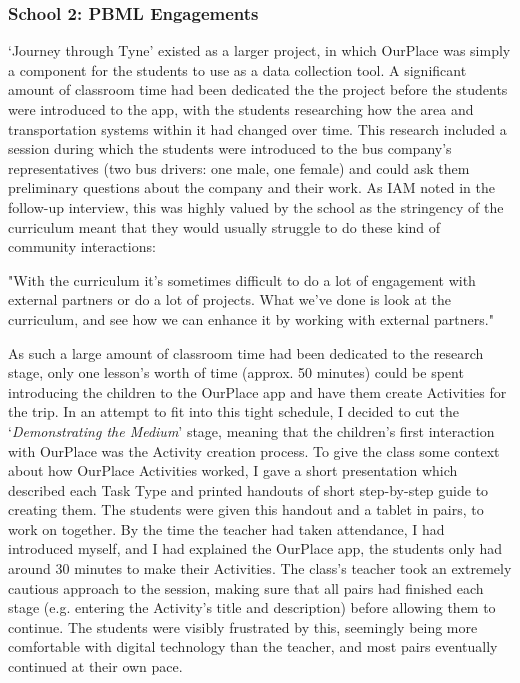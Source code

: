 \subsubsection{School 2: PBML Engagements}
`Journey through Tyne' existed as a larger project, in which OurPlace was simply a component for the students to use as a data collection tool. A significant amount of classroom time had been dedicated the the project before the students were introduced to the app, with the students researching how the area and transportation systems within it had changed over time. This research included a session during which the students were introduced to the bus company's representatives (two bus drivers: one male, one female) and could ask them preliminary questions about the company and their work. As IAM noted in the follow-up interview, this was highly valued by the school as the stringency of the curriculum meant that they would usually struggle to do these kind of community interactions:

\begin{displayquote}
"With the curriculum it's sometimes difficult to do a lot of engagement with external partners or do a lot of projects. What we've done is look at the curriculum, and see how we can enhance it by working with external partners."
\end{displayquote}

As such a large amount of classroom time had been dedicated to the research stage, only one lesson's worth of time (approx. 50 minutes) could be spent introducing the children to the OurPlace app and have them create Activities for the trip. In an attempt to fit into this tight schedule, I decided to cut the `\textit{Demonstrating the Medium}' stage, meaning that the children's first interaction with OurPlace was the Activity creation process. To give the class some context about how OurPlace Activities worked, I gave a short presentation which described each Task Type and printed handouts of short step-by-step guide to creating them. The students were given this handout and a tablet in pairs, to work on together. By the time the teacher had taken attendance, I had introduced myself, and I had explained the OurPlace app, the students only had around 30 minutes to make their Activities. The class's teacher took an extremely cautious approach to the session, making sure that all pairs had finished each stage (e.g. entering the Activity's title and description) before allowing them to continue. The students were visibly frustrated by this, seemingly being more comfortable with digital technology than the teacher, and most pairs eventually continued at their own pace. 

